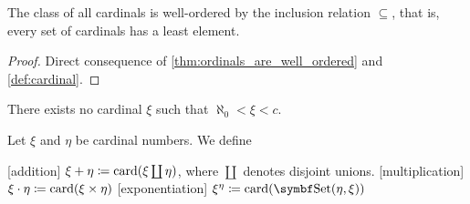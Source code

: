 \begin{proposition}\label{thm:cardinals_well_ordered}
  The class of all cardinals is well-ordered by the inclusion relation \( \subseteq \), that is, every set of cardinals has a least element.
\end{proposition}
\begin{proof}
  Direct consequence of \cref{thm:ordinals_are_well_ordered} and \cref{def:cardinal}.
\end{proof}

\begin{hypothesis}\label{hyp:continuum_hypothesis}
  There exists no cardinal \( \xi \) such that \( \aleph_0 < \xi < c \).
\end{hypothesis}

\begin{definition}\label{def:cardinal_arithmetic}
  Let \( \xi \) and \( \eta \) be cardinal numbers. We define
  \begin{description}
    [addition] \( \xi + \eta \coloneqq \operatorname{card}(\xi \coprod \eta) \), where \( \coprod \) denotes disjoint unions.
    [multiplication] \( \xi \cdot \eta \coloneqq \operatorname{card}(\xi \times \eta) \)
    [exponentiation] \( \xi^\eta \coloneqq \Card(\Bold{Set}(\eta, \xi)) \)
  \end{description}
\end{definition}
